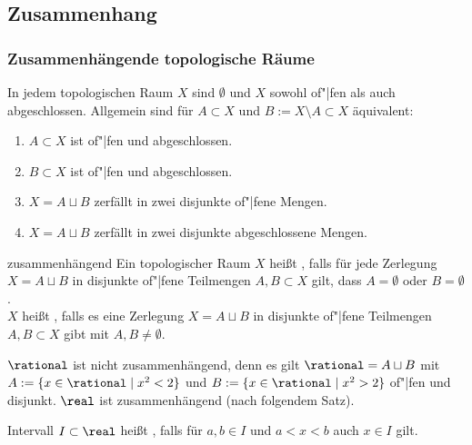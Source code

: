 \subsection{%
    Zusammenhang%
}

\subsubsection{%
    Zusammenhängende topologische Räume%
}

\begin{Bem}
    In jedem topologischen Raum $X$ sind $\emptyset$ und $X$ sowohl of"|fen
    als auch abgeschlossen.
    Allgemein sind für $A \subset X$ und $B := X \setminus A \subset X$
    äquivalent:
    \begin{enumerate}
        \item
        $A \subset X$ ist of"|fen und abgeschlossen.

        \item
        $B \subset X$ ist of"|fen und abgeschlossen.

        \item
        $X = A \sqcup B$ zerfällt in zwei disjunkte of"|fene Mengen.

        \item
        $X = A \sqcup B$ zerfällt in zwei disjunkte abgeschlossene Mengen.
    \end{enumerate}
\end{Bem}

\begin{Def}{zusammenhängend}
    Ein topologischer Raum $X$ heißt
    , falls für jede Zerlegung
    $X = A \sqcup B$ in disjunkte of"|fene Teilmengen $A, B \subset X$ gilt,
    dass $A = \emptyset$ oder $B = \emptyset$. \\
    $X$ heißt , falls es eine Zerlegung
    $X = A \sqcup B$ in disjunkte of"|fene Teilmengen $A, B \subset X$ gibt
    mit $A, B \not= \emptyset$.
\end{Def}

\begin{Bsp}
    $\rational$ ist nicht zusammenhängend, denn es gilt
    $\rational = A \sqcup B$ mit $A := \{x \in \rational \;|\; x^2 < 2\}$
    und $B := \{x \in \rational \;|\; x^2 > 2\}$ of"|fen und disjunkt.
    $\real$ ist zusammenhängend (nach folgendem Satz).
\end{Bsp}

\linie

\begin{Def}{Intervall}
    $I \subset \real$ heißt , falls
    für $a, b \in I$ und $a < x < b$ auch $x \in I$ gilt.
\end{Def}

